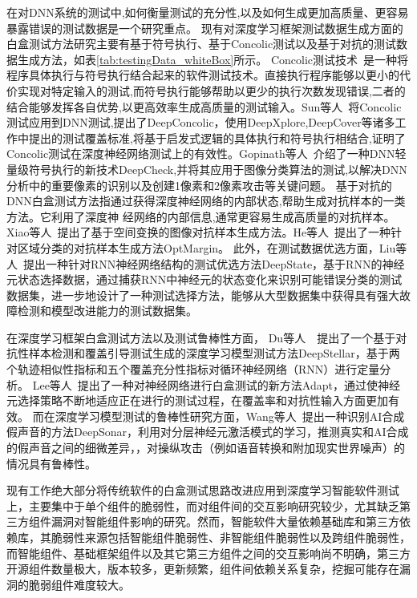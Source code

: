 在对DNN系统的测试中,如何衡量测试的充分性,以及如何生成更加高质量、更容易暴露错误的测试数据是一个研究重点。
现有对深度学习框架测试数据生成方面的白盒测试方法研究主要有基于符号执行、基于Concolic测试以及基于对抗的测试数据生成方法，如表\cref{tab:testingData_whiteBox}所示。
Concolic测试技术~\cite{Majumdar2007Hybrid}是一种将程序具体执行与符号执行结合起来的软件测试技术。直接执行程序能够以更小的代价实现对特定输入的测试,而符号执行能够帮助以更少的执行次数发现错误,二者的结合能够发挥各自优势,以更高效率生成高质量的测试输入。Sun等人~将Concolic测试应用到DNN测试,提出了DeepConcolic，使用DeepXplore,DeepCover等诸多工作中提出的测试覆盖标准,将基于启发式逻辑的具体执行和符号执行相结合,证明了Concolic测试在深度神经网络测试上的有效性。Gopinath等人~介绍了一种DNN轻量级符号执行的新技术DeepCheck,并将其应用于图像分类算法的测试,以解决DNN分析中的重要像素的识别以及创建1像素和2像素攻击等关键问题。
基于对抗的DNN白盒测试方法指通过获得深度神经网络的内部状态,帮助生成对抗样本的一类方法。它利用了深度神
经网络的内部信息,通常更容易生成高质量的对抗样本。Xiao等人~提出了基于空间变换的图像对抗样本生成方法。He等人~提出了一种针对区域分类的对抗样本生成方法OptMargin。
此外，在测试数据优选方面，Liu等人~提出一种针对RNN神经网络结构的测试优选方法DeepState，基于RNN的神经元状态选择数据，通过捕获RNN中神经元的状态变化来识别可能错误分类的测试数据集，进一步地设计了一种测试选择方法，能够从大型数据集中获得具有强大故障检测和模型改进能力的测试数据集。


在深度学习框架白盒测试方法以及测试鲁棒性方面，
Du等人~~提出了一个基于对抗性样本检测和覆盖引导测试生成的深度学习模型测试方法DeepStellar，基于两个轨迹相似性指标和五个覆盖充分性指标对循环神经网络（RNN）进行定量分析。
Lee等人~提出了一种对神经网络进行白盒测试的新方法Adapt，通过使神经元选择策略不断地适应正在进行的测试过程，在覆盖率和对抗性输入方面更加有效。
而在深度学习模型测试的鲁棒性研究方面，Wang等人~提出一种识别AI合成假声音的方法DeepSonar，利用对分层神经元激活模式的学习，推测真实和AI合成的假声音之间的细微差异，，对操纵攻击（例如语音转换和附加现实世界噪声）的情况具有鲁棒性。

现有工作绝大部分将传统软件的白盒测试思路改进应用到深度学习智能软件测试上，主要集中于单个组件的脆弱性，而对组件间的交互影响研究较少，尤其缺乏第三方组件漏洞对智能组件影响的研究。然而，智能软件大量依赖基础库和第三方依赖库，其脆弱性来源包括智能组件脆弱性、非智能组件脆弱性以及跨组件脆弱性，而智能组件、基础框架组件以及其它第三方组件之间的交互影响尚不明确，第三方开源组件数量极大，版本较多，更新频繁，组件间依赖关系复杂，挖掘可能存在漏洞的脆弱组件难度较大。


